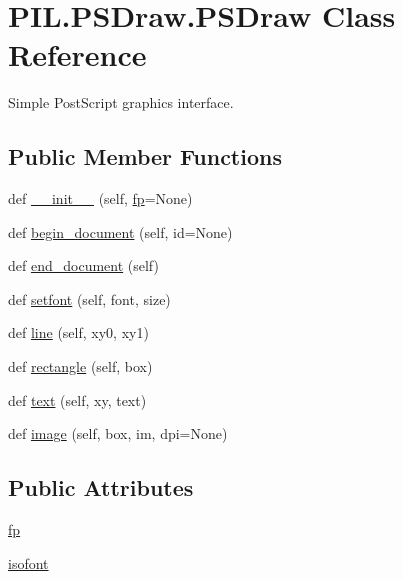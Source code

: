 \hypertarget{classPIL_1_1PSDraw_1_1PSDraw}{}\section{P\+I\+L.\+P\+S\+Draw.\+P\+S\+Draw Class Reference}
\label{classPIL_1_1PSDraw_1_1PSDraw}


Simple Post\+Script graphics interface.  


\subsection*{Public Member Functions}
\begin{DoxyCompactItemize}
\item 
def \hyperlink{classPIL_1_1PSDraw_1_1PSDraw_a766011e5bc915155dc66544291a7c265}{\+\_\+\+\_\+init\+\_\+\+\_\+} (self, \hyperlink{classPIL_1_1PSDraw_1_1PSDraw_a655d736d0957ce64851577c7a8bee9b8}{fp}=None)
\item 
def \hyperlink{classPIL_1_1PSDraw_1_1PSDraw_ada4d3761b9fbda20e9b54e7eb8877e4b}{begin\+\_\+document} (self, id=None)
\item 
def \hyperlink{classPIL_1_1PSDraw_1_1PSDraw_afcb82d39bc441958a5b37b4a38c93141}{end\+\_\+document} (self)
\item 
def \hyperlink{classPIL_1_1PSDraw_1_1PSDraw_a1d1b82fdfb2a77570cfc6db45922afeb}{setfont} (self, font, size)
\item 
def \hyperlink{classPIL_1_1PSDraw_1_1PSDraw_aebff80ba0b0202e977d4868490ac2549}{line} (self, xy0, xy1)
\item 
def \hyperlink{classPIL_1_1PSDraw_1_1PSDraw_a88beeda25cfc8bdd1c05f5f792319cb7}{rectangle} (self, box)
\item 
def \hyperlink{classPIL_1_1PSDraw_1_1PSDraw_a13bd49730a2a17bfbb05bdf4b74f8f30}{text} (self, xy, text)
\item 
def \hyperlink{classPIL_1_1PSDraw_1_1PSDraw_a0d94bde2626f019b7a2dbc391073cbb2}{image} (self, box, im, dpi=None)
\end{DoxyCompactItemize}
\subsection*{Public Attributes}
\begin{DoxyCompactItemize}
\item 
\hyperlink{classPIL_1_1PSDraw_1_1PSDraw_a655d736d0957ce64851577c7a8bee9b8}{fp}
\item 
\hyperlink{classPIL_1_1PSDraw_1_1PSDraw_a9a1a5a349dc901dc348bac835cb808a0}{isofont}
\end{DoxyCompactItemize}


